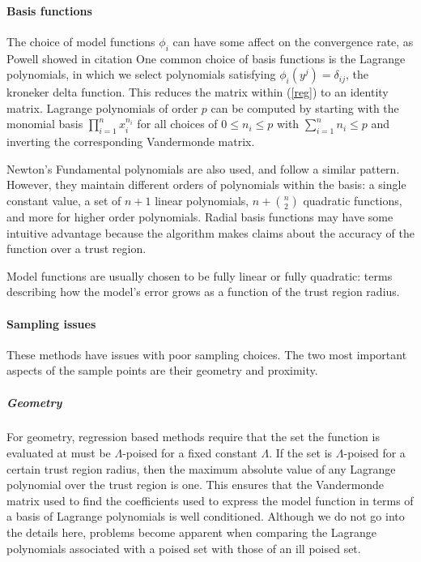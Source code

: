 \documentclass{article}
\let\oldref\ref
\renewcommand{\ref}[1]{(\oldref{#1})}
\begin{document}
\paragraph{Basis functions}

The choice of model functions $\phi_i$ can have some affect on the convergence rate, as Powell showed in \color{red}citation\color{black} %
One common choice of basis functions is the Lagrange polynomials, in which we select polynomials satisfying $\phi_{i}(y^j) = \delta_{ij}$, the kroneker delta function.
This reduces the matrix within \ref{reg} to an identity matrix.
Lagrange polynomials of order $p$ can be computed by starting with the monomial basis $\prod_{i=1}^{n} x_i^{n_i}$ for all choices of $0 \le n_i \le p$ with $\sum_{i=1}^n n_i \le p$ and inverting the corresponding Vandermonde matrix.

Newton's Fundamental polynomials are also used, and follow a similar pattern.
However, they maintain different orders of polynomials within the basis:
a single constant value, a set of $n+1$ linear polynomials,
$n + {n \choose 2}$ quadratic functions, and more for higher order polynomials.
Radial basis functions may have some intuitive advantage because the algorithm makes claims about the accuracy of the function over a trust region.


Model functions are usually chosen to be fully linear or fully quadratic: terms describing how the model's error grows as a function of the trust region radius.

\paragraph{Sampling issues}

These methods have issues with poor sampling choices.
The two most important aspects of the sample points are their geometry and proximity.

\subparagraph{Geometry}

For geometry, regression based methods require that the set the function is evaluated at must be $\Lambda$-poised for a fixed constant $\Lambda$.
If the set is $\Lambda$-poised for a certain trust region radius, then the maximum absolute value of any Lagrange polynomial over the trust region is one.
This ensures that the Vandermonde matrix used to find the coefficients used to express the model function in terms of a basis of Lagrange polynomials is well conditioned.
Although we do not go into the details here, problems become apparent when comparing the Lagrange polynomials associated with a poised set with those of an ill poised set.
\end{document}
